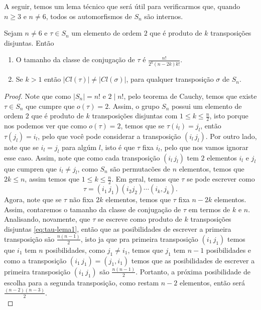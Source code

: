 A seguir, temos um lema técnico que será útil para verificarmos que, quando $n\geq 3$ e $n\neq 6$, todos os automorfismos de $S_n$ são internos. 
\begin{lemma}\label{lema:2.2.3}
  Sejam $n\neq 6$ e $\tau\in S_n$ um elemento de ordem $2$ que é produto de $k$ transposições disjuntas. Então
  \begin{enumerate}
    \item O tamanho da classe de conjugação de $\tau$ é $\displaystyle \frac{n!}{2^{k}(n-2k)k!}$.
    \item Se $k>1$ então $|Cl(\tau)|\neq |Cl(\sigma)|$, para qualquer transposição $\sigma$ de $S_n$. 
  \end{enumerate}
\end{lemma}
\begin{proof} 
  Note que como $|S_n|=n!$ e $2\mid n!$, pelo teorema de Cauchy, temos que existe $\tau\in S_n$ que cumpre que $o(\tau)=2$. Assim, o grupo $S_n$ possui um elemento de ordem $2$ que é produto de $k$ transposições disjuntas com $1\leq k\leq\frac{n}{2}$, isto porque nos podemos ver que como $o(\tau)=2$, temos que se $\tau(i_l)=j_l$, então $\tau(j_l)=i_l$, pelo que você pode considerar a transposição $(i_l\,j_l)$. Por outro lado, note que se $i_l=j_l$ para algúm $l$, isto é que $\tau$ fixa $i_l$, pelo que nos vamos ignorar esse caso. Assim, note que como cada transposição $(i_l\,j_l)$ tem $2$ elementos $i_l$ e $j_l$ que cumpren que $i_l\neq j_l$, como $S_n$ são permutacões de $n$ elementos, temos que $2k\leq n$, assim temos que $1\leq k\leq\frac{n}{2}$. Em geral, temos que $\tau$ se pode escrever como 
  \begin{equation}\label{eq:tau-lema1}
    \tau=(i_1\,j_1)(i_2 j_2)\cdots(i_k,j_k).
  \end{equation}
  Agora, note que se $\tau$ não fixa $2k$ elementos, temos que $\tau$ fixa $n-2k$ elementos.\\
  Assim, contaremos o tamanho da classe de conjugação de $\tau$ em termos de $k$ e $n$. Analisando, novamente, que $\tau$ se escreve como produto de $k$ transposições disjuntas \eqref{eq:tau-lema1}, então que as posibilidades de escrever a primeira transposição são $\frac{n(n-1)}{2}$, isto ja que pra primeira transposição $(i_1\,j_1)$ temos que $i_1$ tem $n$ posibilidades, como $j_1\neq i_1$, temos que $j_1$ tem $n-1$ posibilidades e como a transposição $(i_1\,j_1)=(j_1,i_1)$ temos que as posibilidades de escrever a primeira transposição $(i_1\,j_1)$ são $\frac{n(n-1)}{2}$. Portanto, a próxima posibilidade de escolha para a segunda transposição, como restam $n-2$ elementos, então será $\frac{(n-2)(n-3)}{2}$.\\

\end{proof}
